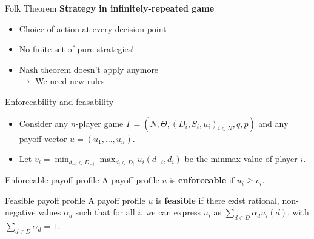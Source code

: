 
\begin{frame}{Folk Theorem}
    \textbf{Strategy in infinitely-repeated game}\\
    \begin{itemize}
        \item Choice of action at every decision point
        \item No finite set of pure strategies!
        \item Nash theorem doesn't apply anymore\\
        $\rightarrow$ We need new rules
    \end{itemize}
\end{frame}



\begin{frame}{Enforceability and feasability}
    \begin{itemize}
        \item Consider any $n$-player game $\Gamma = (N, \Theta, (D_i, S_i, u_i)_{i\in N}, q, p)$ and any payoff vector
        $u = (u_1, \dots, u_n)$.
        \item Let $v_i= \min_{d_{-i}\in D_{-i}} \max_{d_i\in D_i} u_i(d_{-i}, d_i)$ be
        the minmax value of player $i$.
    \end{itemize}

    \begin{block}{Enforceable payoff profile}
        A payoff profile $u$ is \textbf{enforceable} if $u_i \geq v_i$.
    \end{block}

    \begin{block}{Feasible payoff profile}
        A payoff profile $u$ is \textbf{feasible} if there exist rational, non-negative
        values $\alpha_d$ such that for all $i$, we can express $u_i$ as
        $\sum_{d\in D} \alpha_d u_i(d)$, with $\sum_{d\in D} \alpha_d = 1$.
    \end{block}
\end{frame}

